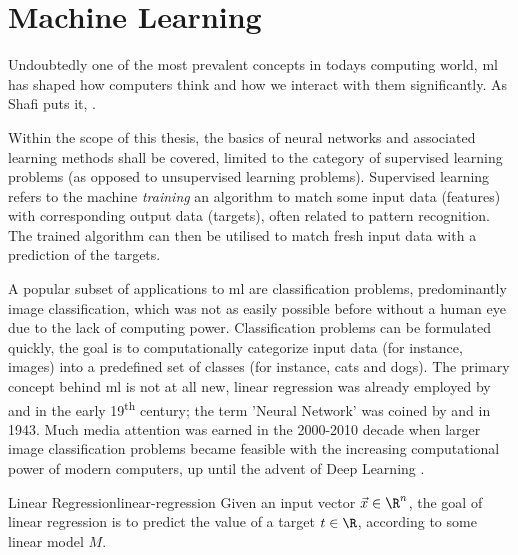 \pagebreak
\section{Machine Learning}
\label{sec:machine-learning}
Undoubtedly one of the most prevalent concepts in todays computing world, \gls{ml} has shaped how computers think and how we interact with them significantly.
As Shafi  puts it, .

Within the scope of this thesis, the basics of neural networks and associated learning methods shall be covered, limited to the category of supervised learning problems (as opposed to unsupervised learning problems).
Supervised learning refers to the machine \textit{training} an algorithm to match some input data (features) with corresponding output data (targets), often related to pattern recognition.
The trained algorithm can then be utilised to match fresh input data with a prediction of the targets.

A popular subset of applications to \gls{ml} are classification problems, predominantly image classification, which was not as easily possible before without a human eye due to the lack of computing power.
Classification problems can be formulated quickly, the goal is to computationally categorize input data (for instance, images) into a predefined set of classes (for instance, cats and dogs).
The primary concept behind \acrlong{ml} is not at all new, linear regression was already employed by  and  in the early 19\textsuperscript{th} century; the term 'Neural Network' was coined by  and  in 1943.
Much media attention was earned in the 2000-2010 decade when larger image classification problems became feasible with the increasing computational power of modern computers, up until the advent of Deep Learning \parencite{bishop-pattern-recognition-and-ml}.

\begin{definition}{Linear Regression}{linear-regression}
  Given an input vector $\vec{x} \in \R^n$, the goal of linear regression is to predict the value of a target $t \in \R$, according to some linear model $M$.
\end{definition}

